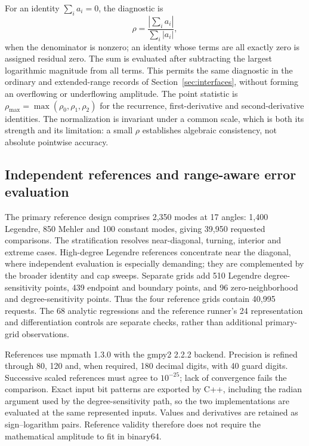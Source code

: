 ﻿\documentclass[11pt,a4paper]{article}
\newcommand{\abs}[1]{\left|#1\right|}
\begin{document}
For an identity $\sum_i a_i=0$, the diagnostic is
\begin{equation}
 \rho=\frac{\abs{\sum_i a_i}}{\sum_i\abs{a_i}},
 \label{eq:normalized_residual}
\end{equation}
when the denominator is nonzero; an identity whose terms are all exactly zero is assigned residual zero. The sum is evaluated after subtracting the largest logarithmic magnitude from all terms. This permits the same diagnostic in the ordinary and extended-range records of Section~\ref{sec:interfaces}, without forming an overflowing or underflowing amplitude. The point statistic is $\rho_{\max}=\max(\rho_0,\rho_1,\rho_2)$ for the recurrence, first-derivative and second-derivative identities. The normalization is invariant under a common scale, which is both its strength and its limitation: a small $\rho$ establishes algebraic consistency, not absolute pointwise accuracy.

\subsection{Independent references and range-aware error evaluation}
\label{sec:reference_protocol}

The primary reference design comprises 2,350 modes at 17 angles: 1,400 Legendre, 850 Mehler and 100 constant modes, giving 39,950 requested comparisons. The stratification resolves near-diagonal, turning, interior and extreme cases. High-degree Legendre references concentrate near the diagonal, where independent evaluation is especially demanding; they are complemented by the broader identity and cap sweeps. Separate grids add 510 Legendre degree-sensitivity points, 439 endpoint and boundary points, and 96 zero-neighborhood and degree-sensitivity points. Thus the four reference grids contain 40,995 requests. The 68 analytic regressions and the reference runner's 24 representation and differentiation controls are separate checks, rather than additional primary-grid observations.

References use mpmath 1.3.0 \citep{Mpmath130} with the gmpy2 2.2.2 backend. Precision is refined through 80, 120 and, when required, 180 decimal digits, with 40 guard digits. Successive scaled references must agree to $10^{-25}$; lack of convergence fails the comparison. Exact input bit patterns are exported by C++, including the radian argument used by the degree-sensitivity path, so the two implementations are evaluated at the same represented inputs. Values and derivatives are retained as sign--logarithm pairs. Reference validity therefore does not require the mathematical amplitude to fit in binary64.
\end{document}
